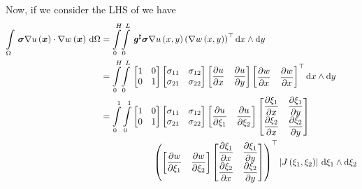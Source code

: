 Now, if we consider the LHS of  we have
\begin{equation}
  \begin{aligned}
    \gint{\Omega}{}{\dotprod{\tensortwo{\sigma}\gradient{}{\fnof{u}{\vectr{x}}}}{\gradient{}{\fnof{w}{\vectr{x}}}}}{\Omega}&=
    \giint{0}{H}{0}{L}{\sharptensor{\tensortwo{g}}\tensortwo{\sigma}\gradient{}{\fnof{u}{x,y}}
      \transpose{\pbrac{\gradient{}{\fnof{w}{x,y}}}}}{x}{y}\\
    &=\giint{0}{H}{0}{L}{\begin{bmatrix}
        1 & 0 \\
        0 & 1
      \end{bmatrix}\begin{bmatrix}
        \sigma_{11} & \sigma_{12} \\
        \sigma_{21} & \sigma_{22}\end{bmatrix}
      \begin{bmatrix}\delby{u}{x}&\delby{u}{y}\end{bmatrix}
      \transpose{\begin{bmatrix}\delby{w}{x}&\delby{w}{x}\end{bmatrix}}}{x}{y} \\
    &=\dintl{0}{1}\dintl{0}{1}\begin{bmatrix}
        1 & 0 \\
        0 & 1
    \end{bmatrix}\begin{bmatrix}
      \sigma_{11} & \sigma_{12} \\
      \sigma_{21} & \sigma_{22}
    \end{bmatrix}
    \begin{bmatrix}\delby{u}{\xi_{1}}&\delby{u}{\xi_{2}}\end{bmatrix}\begin{bmatrix}
      \delby{\xi_{1}}{x} & \delby{\xi_{1}}{y} \\
      \delby{\xi_{2}}{x} & \delby{\xi_{2}}{y}
    \end{bmatrix} \\
    &\qquad\qquad\qquad\transpose{\pbrac{\begin{bmatrix}\delby{w}{\xi_{1}}&\delby{w}{\xi_{2}}\end{bmatrix}\begin{bmatrix}
          \delby{\xi_{1}}{x} & \delby{\xi_{1}}{y} \\
          \delby{\xi_{2}}{x} & \delby{\xi_{2}}{y}
    \end{bmatrix}}}\abs{\fnof{J}{\xi_{1},\xi_{2}}}\,\exteriorderivop\xi_{1}\wedge\exteriorderivop\xi_{2} \\ 

\end{aligned}
\end{equation}
